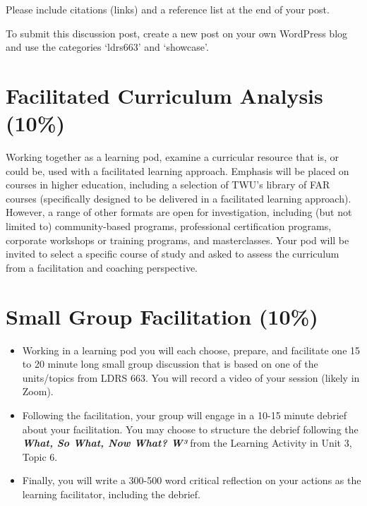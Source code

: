 \documentclass[
]{book}
\providecommand{\tightlist}{%
  \setlength{\itemsep}{0pt}\setlength{\parskip}{0pt}}
\begin{document}
Please include citations (links) and a reference list at the end of your post.

To submit this discussion post, create a new post on your own WordPress blog and use the categories `ldrs663' and `showcase'.

\hypertarget{facilitated-curriculum-analysis-10}{%
\section*{Facilitated Curriculum Analysis (10\%)}\label{facilitated-curriculum-analysis-10}}

Working together as a learning pod, examine a curricular resource that is, or could be, used with a facilitated learning approach. Emphasis will be placed on courses in higher education, including a selection of TWU's library of FAR courses (specifically designed to be delivered in a facilitated learning approach). However, a range of other formats are open for investigation, including (but not limited to) community-based programs, professional certification programs, corporate workshops or training programs, and masterclasses. Your pod will be invited to select a specific course of study and asked to assess the curriculum from a facilitation and coaching perspective.

\hypertarget{small-group-facilitation-10}{%
\section*{Small Group Facilitation (10\%)}\label{small-group-facilitation-10}}

\begin{itemize}
\tightlist
\item
  Working in a learning pod you will each choose, prepare, and facilitate one 15 to 20 minute long small group discussion that is based on one of the units/topics from LDRS 663. You will record a video of your session (likely in Zoom).\\
\item
  Following the facilitation, your group will engage in a 10-15 minute debrief about your facilitation. You may choose to structure the debrief following the \textbf{\emph{What, So What, Now What? W³}} from the Learning Activity in Unit 3, Topic 6.\\
\item
  Finally, you will write a 300-500 word critical reflection on your actions as the learning facilitator, including the debrief.
\end{itemize}
\end{document}
